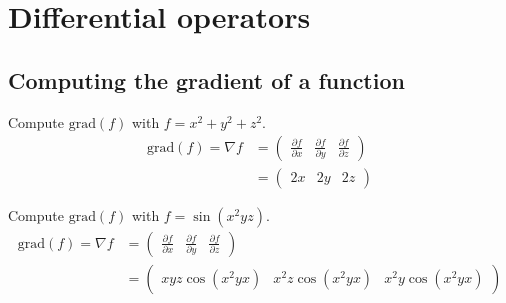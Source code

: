 \section{Differential operators}
  

  \subsection{Computing the gradient of a function}
  Compute $\text{grad}(f)$ with $f = x^2 + y^2 + z^2$.
  \begin{align*}
    \text{grad}(f) = \nabla f 
      & = \begin{pmatrix} 
            \frac{\partial f}{\partial x} &
            \frac{\partial f}{\partial y} &
            \frac{\partial f}{\partial z}
          \end{pmatrix} \\
      & = \begin{pmatrix}
            2x & 2y & 2z
          \end{pmatrix}
  \end{align*}

  Compute $\text{grad}(f)$ with $f = \sin(x^2yz)$.
  \begin{align*}
    \text{grad}(f) = \nabla f 
      & = \begin{pmatrix} 
            \frac{\partial f}{\partial x} &
            \frac{\partial f}{\partial y} &
            \frac{\partial f}{\partial z}
          \end{pmatrix} \\
      & = \begin{pmatrix}
            xyz\cos(x^2yx) & 
            x^2z\cos(x^2yx) &
            x^2y\cos(x^2yx)
          \end{pmatrix}
  \end{align*}

